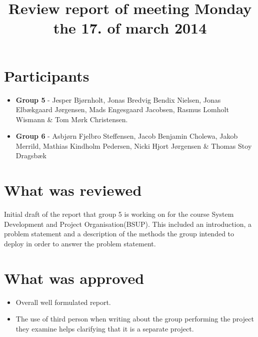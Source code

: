 \documentclass[]{article}
\title{Review report of meeting Monday the 17. of march 2014}
\begin{document}
\maketitle


\section*{Participants}
\begin{itemize}
\item \textbf{Group 5} - Jesper Bj\o rnholt, Jonas Bredvig Bendix Nielsen, Jonas Elb\ae kgaard J\o rgensen, Mads Engesgaard Jacobsen, Rasmus Lomholt Wismann \& Tom M\o rk Christensen.
\item \textbf{Group 6} - Asbj\o rn Fjelbro Steffensen, Jacob Benjamin Cholewa, Jakob Merrild, Mathias Kindholm Pedersen, Nicki Hjort J\o rgensen \& Thomas Stoy Dragsb\ae k
\end{itemize}
\section*{What was reviewed}
Initial draft of the report that group 5 is working on for the course System Development and Project Organisation(BSUP). This included an introduction, a problem statement and a description of the methods the group intended to deploy in order to answer the problem statement.
\section*{What was approved}
\begin{itemize}
\item Overall well formulated report.
\item The use of third person when writing about the group performing the project they examine helps clarifying that it is a separate project.
\end{itemize}
\end{document}
